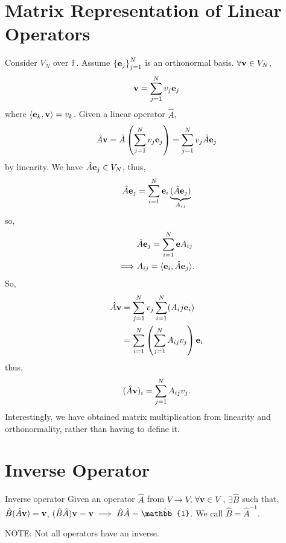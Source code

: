 \documentclass{book}
\def\innerproduct#1#2{\langle#1,#2\rangle}
\begin{document}
\section{Matrix Representation of Linear Operators}
Consider $V_N$ over $\mathbb{F}$. Assume $\left\{\vb{e}_j\right\}_{j=1}^N$ is an orthonormal basis. $\forall \vb{v} \in V_N$,
\begin{equation}
	\vb{v} = \sum_{j=1}^Nv_j \vb{e}_j
\end{equation}
where $\innerproduct{\vb{e}_k}{\vb{v}} = v_k$. Given a linear operator $\hat{A}$,
\begin{equation}
	\hat{A} \vb{v} = \hat{A} \left(\sum_{j=1}^N v_j\vb{e}_j\right) = \sum_{j=1}^Nv_j\hat{A}\vb{e}_j
\end{equation}
by linearity. We have $\hat{A}\vb{e}_j \in V_N$, thus,
\begin{equation}
	\hat{A} \vb{e}_j = \sum_{i=1}^N\vb{e}_i\underbrace{(\hat{A}\vb{e}_j)}_{A_{ij}}
\end{equation}
so,
\begin{equation}
	\begin{split}
		& \hat{A}\vb{e}_j = \sum_{i=1}^N\vb{e}A_{ij} \\
		\implies & A_{ij} = \innerproduct{\vb{e}_i}{\hat{A}\vb{e}_j}.
	\end{split}
\end{equation}
So,
\begin{equation}
	\begin{split}
		\hat{A}\vb{v} & = \sum_{j=1}^Nv_j\sum_{i=1}^N(A_ij\vb{e}_i) \\
		& =\sum_{i=1}^{N}\left(\sum_{j=1}^NA_{ij}v_j\right)\vb{e}_i
	\end{split}
\end{equation}
thus,
\begin{equation}
	(\hat{A}\vb{v})_i = \sum_{j=1}^N A_{ij}v_j.
\end{equation}
Interestingly, we have obtained matrix multiplication from linearity and orthonormality, rather than having to define it.
\section{Inverse Operator}
\begin{Definitions}{Inverse operator}{}
	Given an operator $\hat{A}$ from $V \to V$, $\forall \vb{v} \in V$, $\exists \hat{B}$ such that, $\hat{B}(\hat{A}\vb{v}) = \vb{v}$, $(\hat{B}\hat{A})\vb{v} = \vb{v} \implies \hat{B}\hat{A} = \hat{\mathbb{1}}$. We call $\hat{B} = \hat{A}^{-1}$.
\end{Definitions}
NOTE: Not all operators have an inverse.
\end{document}
